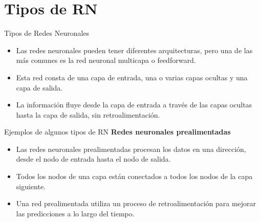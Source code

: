 \documentclass[11pt,aspectratio=169]{beamer}
\begin{document}
\section{Tipos de RN}
\begin{frame}{Tipos de Redes Neuronales}
	\begin{itemize}
		\item Las redes neuronales pueden tener diferentes arquitecturas, pero una de las más comunes es la red neuronal multicapa o 
			feedforward.\pause 
		\item Esta red consta de una capa de entrada, una o varias capas ocultas y una capa de salida.\pause
		\item La información fluye desde la capa de entrada a través de las capas ocultas hasta la capa de salida, sin retroalimentación.
	\end{itemize}
\end{frame}

\begin{frame}{Ejemplos de algunos tipos de RN}
	\textbf{Redes neuronales prealimentadas}
	\begin{itemize}
		\item Las redes neuronales prealimentadas procesan los datos en una dirección, desde el nodo de entrada hasta el nodo de salida. \pause
		\item Todos los nodos de una capa están conectados a todos los nodos de la capa siguiente.\pause
		\item Una red prealimentada utiliza un proceso de retroalimentación para mejorar las predicciones a lo largo del tiempo.
	\end{itemize}
\end{frame}
\end{document}

